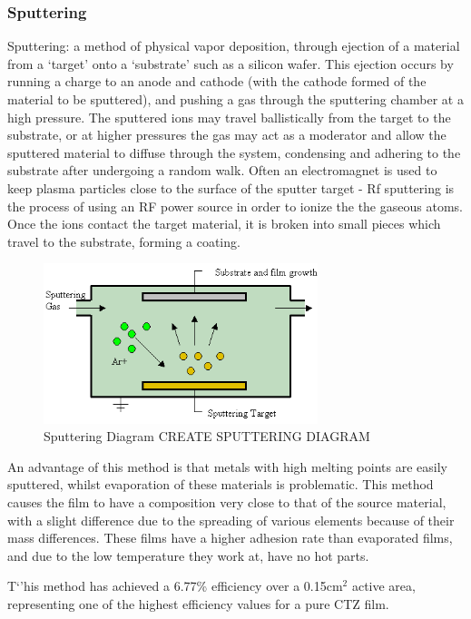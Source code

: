 \documentclass[11pt,a4paper,twoside]{article}
\begin{document}
\subsubsection{Sputtering}
Sputtering: a method of physical vapor deposition, through ejection of a material from a `target' onto a `substrate' such as a silicon wafer. This ejection occurs by running a charge to an anode and cathode (with the cathode formed of the material to be sputtered), and pushing a gas through the sputtering chamber at a high pressure. The sputtered ions may travel ballistically from the target to the substrate, or at higher pressures the gas may act as a moderator and allow the sputtered material to diffuse through the system, condensing and adhering to the substrate after undergoing a random walk.
Often an electromagnet is used to keep plasma particles close to the surface of the sputter target - Rf sputtering is the process of using an RF power source in order to ionize the the gaseous atoms. Once the ions contact the target material, it is broken into small pieces which travel to the substrate, forming a coating.
\begin{figure}
\includegraphics[width=80mm]{sputtering.png}
\caption{Sputtering Diagram CREATE SPUTTERING DIAGRAM}
    \label{fig:Sputtering}
\end{figure}
An advantage of this method is that metals with high melting points are easily sputtered, whilst evaporation of these materials is problematic. This method causes the film to have a composition very close to that of the source material, with a slight difference due to the spreading of various elements because of their mass differences. These films have a higher adhesion rate than evaporated films, and due to the low temperature they work at, have no hot parts.

T`'his method has achieved a 6.77\% efficiency over a 0.15cm$^2$ active area, representing one of the highest efficiency values for a pure CTZ film. \citep{Mitzi2011}
\end{document}
